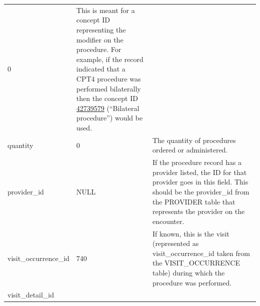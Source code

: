 \documentclass[11pt]{book}
\theoremstyle{definition}
\theoremstyle{definition}
\theoremstyle{definition}
\theoremstyle{remark}
\begin{document}
\begin{longtable}[]{@{}lll@{}}
\begin{minipage}[t]{0.15\columnwidth}
0\strut
\end{minipage} & \begin{minipage}[t]{0.49\columnwidth}\raggedright
This is meant for a concept ID representing the modifier on the procedure. For example, if the record indicated that a CPT4 procedure was performed bilaterally then the concept ID \href{http://athena.ohdsi.org/search-terms/terms/42739579}{42739579} (``Bilateral procedure'') would be used.\strut
\end{minipage}\tabularnewline
\begin{minipage}[t]{0.28\columnwidth}\raggedright
quantity\strut
\end{minipage} & \begin{minipage}[t]{0.15\columnwidth}\raggedright
0\strut
\end{minipage} & \begin{minipage}[t]{0.49\columnwidth}\raggedright
The quantity of procedures ordered or administered.\strut
\end{minipage}\tabularnewline
\begin{minipage}[t]{0.28\columnwidth}\raggedright
provider\_id\strut
\end{minipage} & \begin{minipage}[t]{0.15\columnwidth}\raggedright
NULL\strut
\end{minipage} & \begin{minipage}[t]{0.49\columnwidth}\raggedright
If the procedure record has a provider listed, the ID for that provider goes in this field. This should be the provider\_id from the PROVIDER table that represents the provider on the encounter.\strut
\end{minipage}\tabularnewline
\begin{minipage}[t]{0.28\columnwidth}\raggedright
visit\_occurrence\_id\strut
\end{minipage} & \begin{minipage}[t]{0.15\columnwidth}\raggedright
740\strut
\end{minipage} & \begin{minipage}[t]{0.49\columnwidth}\raggedright
If known, this is the visit (represented as visit\_occurrence\_id taken from the VISIT\_OCCURRENCE table) during which the procedure was performed.\strut
\end{minipage}\tabularnewline
\begin{minipage}[t]{0.28\columnwidth}\raggedright
visit\_detail\_id\strut
\end{minipage} & \begin{minipage}[t]{0.15\columnwidth}\raggedright

\end{minipage}
\end{longtable}
\end{document}
